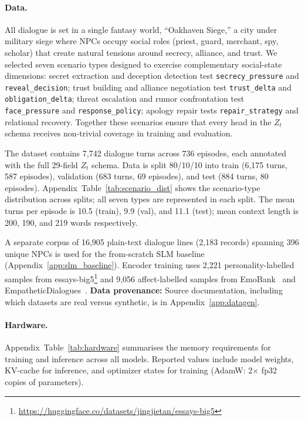 \documentclass[11pt]{article}
\begin{document}
\paragraph{Data.}
All dialogue is set in a single fantasy world, ``Oakhaven Siege,'' a city under military siege where NPCs occupy social roles (priest, guard, merchant, spy, scholar) that create natural tensions around secrecy, alliance, and trust.
We selected seven scenario types designed to exercise complementary social-state dimensions: secret extraction and deception detection test \texttt{secrecy\_pressure} and \texttt{reveal\_decision}; trust building and alliance negotiation test \texttt{trust\_delta} and \texttt{obligation\_delta}; threat escalation and rumor confrontation test \texttt{face\_pressure} and \texttt{response\_policy}; apology repair tests \texttt{repair\_strategy} and relational recovery.
Together these scenarios ensure that every head in the $Z_t$ schema receives non-trivial coverage in training and evaluation.

The dataset contains 7,742 dialogue turns across 736 episodes, each annotated with the full 29-field $Z_t$ schema.
Data is split 80/10/10 into train (6,175 turns, 587 episodes), validation (683 turns, 69 episodes), and test (884 turns, 80 episodes).
Appendix~Table~\ref{tab:scenario_dist} shows the scenario-type distribution across splits; all seven types are represented in each split.
The mean turns per episode is 10.5 (train), 9.9 (val), and 11.1 (test); mean context length is 200, 190, and 219 words respectively.

A separate corpus of 16,905 plain-text dialogue lines (2,183 records) spanning 396 unique NPCs is used for the from-scratch SLM baseline (Appendix~\ref{app:slm_baseline}).
Encoder training uses 2,221 personality-labelled samples from essays-big5\footnote{\url{https://huggingface.co/datasets/jingjietan/essays-big5}} and 9,056 affect-labelled samples from EmoBank~\cite{buechel2017emobank} and EmpatheticDialogues~\cite{rashkin2019empathetic}.
\textbf{Data provenance:} Source documentation, including which datasets are real versus synthetic, is in Appendix~\ref{app:datagen}.

\paragraph{Hardware.}
Appendix~Table~\ref{tab:hardware} summarises the memory requirements for training and inference across all models.
Reported values include model weights, KV-cache for inference, and optimizer states for training (AdamW: 2$\times$ fp32 copies of parameters).
\end{document}
